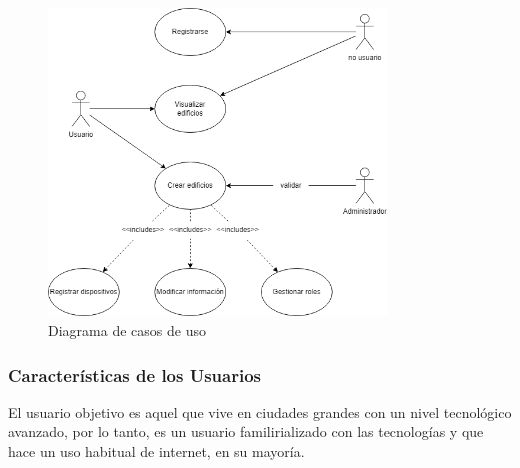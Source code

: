 \documentclass[12pt, a4paper, twoside]{article}
\begin{document}
\begin{figure}[h]
  \centering
  \includegraphics[width=0.8\textwidth]{UserCase.0.1.png}
  \caption{Diagrama de casos de uso}
\end{figure}


 \subsubsection{Características de los Usuarios}
 El usuario objetivo es aquel que vive en ciudades grandes con un nivel tecnológico avanzado,
 por lo tanto, es un usuario familirializado con las tecnologías y que hace un uso
 habitual de internet, en su mayoría.
\end{document}
